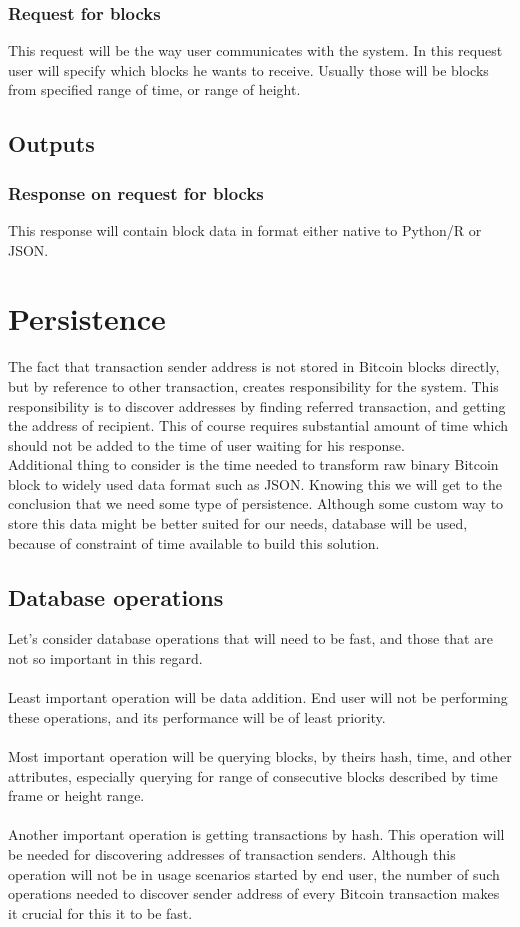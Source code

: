 \documentclass[12pt, en, eng, oneside]{mgr}
\begin{document}
\subsubsection{Request for blocks} This request will be the way user communicates with the system. In this request user will specify which blocks he wants to receive. Usually those will be blocks from specified range of time, or range of height.

\subsection{Outputs}
\subsubsection{Response on request for blocks} This response will contain block data in format either native to Python/R or JSON.


\section{Persistence}
The fact that transaction sender address is not stored in Bitcoin blocks directly, but by reference to other transaction, creates responsibility for the system. This responsibility is to discover addresses by finding referred transaction, and getting the address of recipient. This of course requires substantial amount of time which should not be added to the time of user waiting for his response. 
\\
Additional thing to consider is the time needed to transform raw binary Bitcoin block to widely used data format such as JSON. Knowing this we will get to the conclusion that we need some type of persistence. Although some custom way to store this data might be better suited for our needs, database will be used, because of constraint of time available to build this solution.

\subsection{Database operations}
Let's consider database operations that will need to be fast, and those that are not so important in this regard.
\\
\\
Least important operation will be data addition. End user will not be performing these operations, and its performance will be of least priority.
\\
\\
Most important operation will be querying blocks, by theirs hash, time, and other attributes, especially querying for range of consecutive blocks described by time frame or height range.
\\
\\
Another important operation is getting transactions by hash. This operation will be needed for discovering addresses of transaction senders. Although this operation will not be in usage scenarios started by end user, the number of such operations needed to discover sender address of every Bitcoin transaction makes it crucial for this it to be fast.
\end{document}
